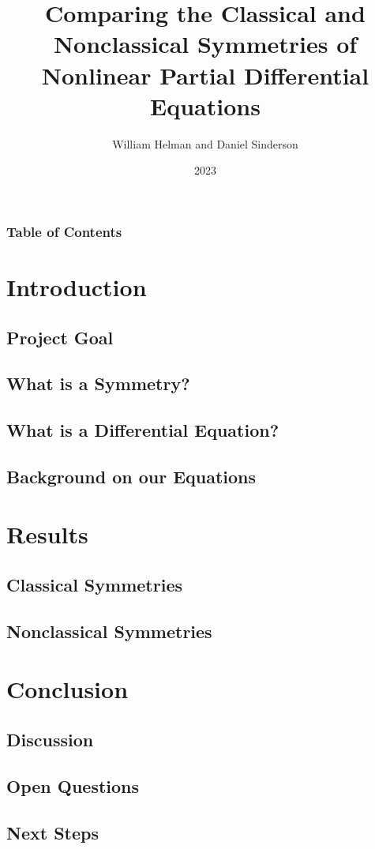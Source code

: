 \documentclass{beamer}
\title{Comparing the Classical and Nonclassical Symmetries of Nonlinear Partial Differential Equations}
\author{William Helman and Daniel Sinderson}
\institute{Southern Oregon University}
\date{2023}
\begin{document}
\frame{\titlepage}
\begin{frame}
    \frametitle{Table of Contents}
    \tableofcontents
\end{frame}

\section{Introduction}
    \subsection{Project Goal}
    \subsection{What is a Symmetry?}
    \subsection{What is a Differential Equation?}
    \subsection{Background on our Equations}
\section{Results}
    \subsection{Classical Symmetries}
    \subsection{Nonclassical Symmetries}
\section{Conclusion}
    \subsection{Discussion}
    \subsection{Open Questions}
    \subsection{Next Steps}
\end{document}
